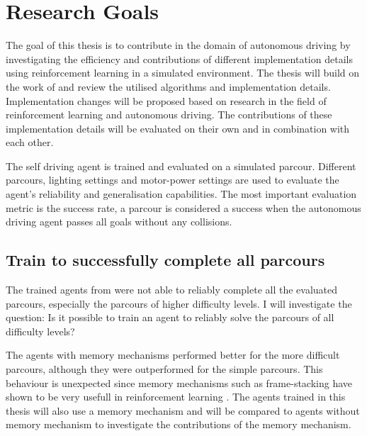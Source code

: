 


\chapter{Research Goals}
\label{cha:Research Goals}

The goal of this thesis is to contribute in the domain of autonomous driving by investigating the efficiency and contributions of different implementation details using reinforcement learning in a simulated environment. The thesis will build on the work of \autocite{maximilian} and review the utilised algorithms and implementation details. Implementation changes will be proposed based on research in the field of reinforcement learning and autonomous driving. The contributions of these implementation details will be evaluated on their own and in combination with each other. 


The self driving agent is trained and evaluated on a simulated parcour. Different parcours, lighting settings and motor-power settings are used to evaluate the agent's reliability and generalisation capabilities. The most important evaluation metric is the success rate, a parcour is considered a success when the autonomous driving agent passes all goals without any collisions.

\section*{Train to successfully complete all parcours}

The trained agents from \autocite{maximilian} were not able to reliably complete all the evaluated parcours, especially the parcours of higher difficulty levels. I will investigate the question: Is it possible to train an agent to reliably solve the parcours of all difficulty levels?

The agents \autocite{maximilian} with memory mechanisms performed better for the more difficult parcours, although they were outperformed for the simple parcours. This behaviour is unexpected since memory mechanisms such as frame-stacking have shown to be very usefull in reinforcement learning \autocite{human_level_control}. The agents trained in this thesis will also use a memory mechanism and will be compared to agents without memory mechanism to investigate the contributions of the memory mechanism.


